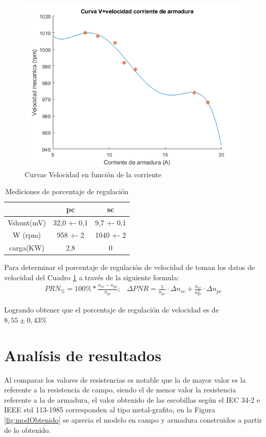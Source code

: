 \documentclass[11pt,letterpaper]{article}     %
\begin{document}
	\begin{figure}[H]
		\centering
		\includegraphics[scale=0.8]{./recursos-Lab6/curvaVelocidadCorriente.png}
		\caption{Curvas Velocidad en función de la corriente}
		\label{fig:CurvaDeVelocidadCorriente}
	\end{figure}

	
	\begin{table}[H]
		\centering
		\caption{Mediciones de porcentaje de regulación}
		\label{Cuadro:Medicion porcentaje de regulacion}
		\begin{tabular}{|c|c|c|}
			\hline
			& pc & sc\\ \hline
			Vshunt(mV)& 32,0 +- 0,1 & 9,7 +- 0,1 \\ \hline
			W (rpm)& 958 +- 2 &1040 +- 2 \\ \hline
			carga(KW)  & 2,8 &0\\ \hline
		\end{tabular}
	\end{table}
 Para determinar el porcentaje de regulación de velocidad de toman los datos de velocidad del Cuadro \ref{Cuadro:Medicion porcentaje de regulacion} a través de la siguiente formula:
 \begin{eqnarray}
  PRN_{\%} =100\%*\frac{n_{sc}-n_{pc}}{n_{pc}}; 
  & \Delta PNR = \frac{1 }{n_{pc}}\cdot \Delta n_{sc}+\frac{n_{sc} }{n_{pc}^2}\cdot \Delta n_{pc}
 \end{eqnarray}
 
Logrando obtener que el porcentaje de regulación de velocidad es de $8,55 \pm 0,43 \%$
\section{Analísis de resultados}
Al comparar los valores de resistencias es notable que la de mayor valor es la referente a la resistencia de campo, siendo el de menor valor la resistencia referente a la de armadura, el valor obtenido de las escobillas según el IEC 34-2 e IEEE std 113-1985 corresponden al tipo metal-grafito, en la Figura \ref{fig:modObtenido} se aprecia el modelo en campo y armadura construidos a partir de lo obtenido.\\
\end{document}
